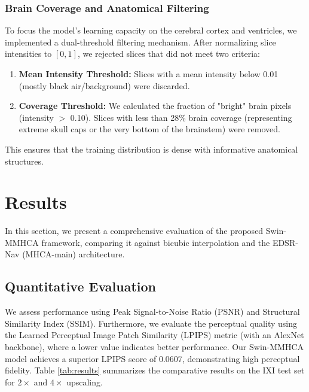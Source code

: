 \documentclass{IEEEoj}
\begin{document}
\subsubsection{Brain Coverage and Anatomical Filtering}
To focus the model's learning capacity on the cerebral cortex and ventricles, we implemented a dual-threshold filtering mechanism. After normalizing slice intensities to $[0, 1]$, we rejected slices that did not meet two criteria:
\begin{enumerate}
    \item \textbf{Mean Intensity Threshold:} Slices with a mean intensity below 0.01 (mostly black air/background) were discarded.
    \item \textbf{Coverage Threshold:} We calculated the fraction of "bright" brain pixels (intensity $>$ 0.10). Slices with less than 28\% brain coverage (representing extreme skull caps or the very bottom of the brainstem) were removed.
\end{enumerate}
This ensures that the training distribution is dense with informative anatomical structures.

\section{Results}
In this section, we present a comprehensive evaluation of the proposed Swin-MMHCA framework, comparing it against bicubic interpolation and the EDSR-Nav (MHCA-main) architecture.

\subsection{Quantitative Evaluation}
We assess performance using Peak Signal-to-Noise Ratio (PSNR) and Structural Similarity Index (SSIM). Furthermore, we evaluate the perceptual quality using the Learned Perceptual Image Patch Similarity (LPIPS) metric (with an AlexNet backbone), where a lower value indicates better performance. Our Swin-MMHCA model achieves a superior LPIPS score of 0.0607, demonstrating high perceptual fidelity. Table \ref{tab:results} summarizes the comparative results on the IXI test set for $2\times$ and $4\times$ upscaling.
\end{document}
